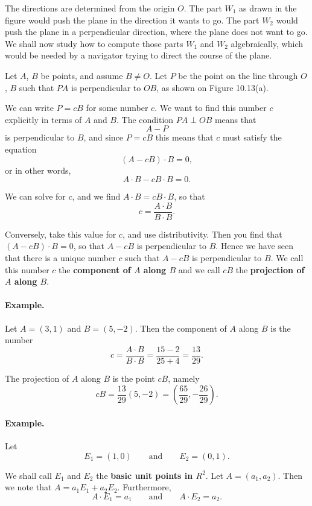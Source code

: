 \documentclass[12pt]{book} %
\begin{document}
\begin{ExerciseList}
The directions are determined from the origin $O$. The part $W_1$ as drawn in the figure would push the plane in the direction it wants to go. The part $W_2$ would push the plane in a perpendicular direction, where the plane does not want to go. We shall now study how to compute those parts $W_1$ and $W_2$ algebraically, which would be needed by a navigator trying to direct the course of the plane.

Let $A$, $B$ be points, and assume $B\ne O$. Let $P$ be the point on the line through $O$, $B$ such that $PA$ is perpendicular to $OB$, as shown on Figure 10.13(a).


We can write $P=cB$ for some number $c$. We want to find this number $c$ explicitly in terms of $A$ and $B$. The condition $PA\perp OB$ means that
\[
A-P
\]
is perpendicular to $B$,
and since $P=cB$ this means that $c$ must satisfy the equation
\[
(A-cB)\cdot B=0,
\]
or in other words,
\[
A\cdot B-cB\cdot B=0.
\]

We can solve for $c$, and we find $A\cdot B=cB\cdot B$, so that
\[
c=\frac{A\cdot B}{B\cdot B}.
\]

Conversely, take this value for $c$, and use distributivity. Then you find that $(A-cB)\cdot B=0$, so that $A-cB$ is perpendicular to $B$. Hence we have seen that there is a unique number $c$ such that $A-cB$ is perpendicular to $B$. We call this number $c$ the \textbf{component of $A$ along $B$} and we call $cB$ the \textbf{projection of $A$ along $B$}.

\paragraph{Example.}
Let $A=(3,1)$ and $B=(5,-2)$. Then the component of $A$ along $B$ is the number
\[
c=\frac{A\cdot B}{B\cdot B}=\frac{15-2}{25+4}=\frac{13}{29}.
\]

The projection of $A$ along $B$ is the point $cB$, namely
\[
cB=\frac{13}{29}(5,-2)=\left(\frac{65}{29},-\frac{26}{29}\right).
\]

\paragraph{Example.}
Let
\[
E_1=(1,0)
\qquad \text{and} \qquad
E_2=(0,1).
\]

We shall call $E_1$ and $E_2$ the \textbf{basic unit points in $R^2$}. Let $A=(a_1,a_2)$. Then we note that $A=a_1E_1+a_2E_2$. Furthermore,
\[
A\cdot E_1=a_1
\qquad \text{and} \qquad
A\cdot E_2=a_2.
\]


\end{ExerciseList}
\end{document}

